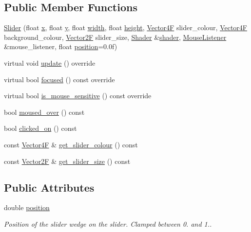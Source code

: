 \subsection*{Public Member Functions}
\begin{DoxyCompactItemize}
\item 
\mbox{\hyperlink{class_slider_ad9bceb3f462c084a91bfe910065fe94f}{Slider}} (float \mbox{\hyperlink{class_g_u_i_a7fa193a8ffb27bbb3bcc225e36f6d54d}{x}}, float \mbox{\hyperlink{class_g_u_i_a98f204f99ffc5ff6cffc9340bbb8c29b}{y}}, float \mbox{\hyperlink{class_g_u_i_aee5d8766834f6f743f0d8b8c16e47155}{width}}, float \mbox{\hyperlink{class_g_u_i_a70b578c36323a45cac88ccff3bced933}{height}}, \mbox{\hyperlink{class_vector4}{Vector4F}} slider\+\_\+colour, \mbox{\hyperlink{class_vector4}{Vector4F}} background\+\_\+colour, \mbox{\hyperlink{class_vector2}{Vector2F}} slider\+\_\+size, \mbox{\hyperlink{class_shader}{Shader}} \&\mbox{\hyperlink{class_g_u_i_a64b007b31d0ec8a8704f9ab3bb2a7d3d}{shader}}, \mbox{\hyperlink{class_mouse_listener}{Mouse\+Listener}} \&mouse\+\_\+listener, float \mbox{\hyperlink{class_slider_ad699d9f4196d57dc18d1bdfd4d74bf67}{position}}=0.\+0f)
\item 
virtual void \mbox{\hyperlink{class_slider_a4ebd527db54ea263c7d0efe4d1f94e1b}{update}} () override
\item 
virtual bool \mbox{\hyperlink{class_slider_a30b01348a5d214f3078e22516c60a763}{focused}} () const override
\item 
virtual bool \mbox{\hyperlink{class_slider_a8d7d12aa4bc5d26de46790b43116bcc1}{is\+\_\+mouse\+\_\+sensitive}} () const override
\item 
bool \mbox{\hyperlink{class_slider_a736d0f12de097fa94f1b1b718f4f76a7}{moused\+\_\+over}} () const
\item 
bool \mbox{\hyperlink{class_slider_a59e849b069f0a02451e93a63884555c4}{clicked\+\_\+on}} () const
\item 
const \mbox{\hyperlink{class_vector4}{Vector4F}} \& \mbox{\hyperlink{class_slider_a660889686a2d0b9d73fb25cfb9eaff9a}{get\+\_\+slider\+\_\+colour}} () const
\item 
const \mbox{\hyperlink{class_vector2}{Vector2F}} \& \mbox{\hyperlink{class_slider_a235e764dfafeacc678b77f5300f44dba}{get\+\_\+slider\+\_\+size}} () const
\end{DoxyCompactItemize}
\subsection*{Public Attributes}
\begin{DoxyCompactItemize}
\item 
\mbox{\label{class_slider_ad699d9f4196d57dc18d1bdfd4d74bf67}} 
double \mbox{\hyperlink{class_slider_ad699d9f4196d57dc18d1bdfd4d74bf67}{position}}
\begin{DoxyCompactList}\small\item\em Position of the slider wedge on the slider. Clamped between 0. and 1.. \end{DoxyCompactList}\end{DoxyCompactItemize}
